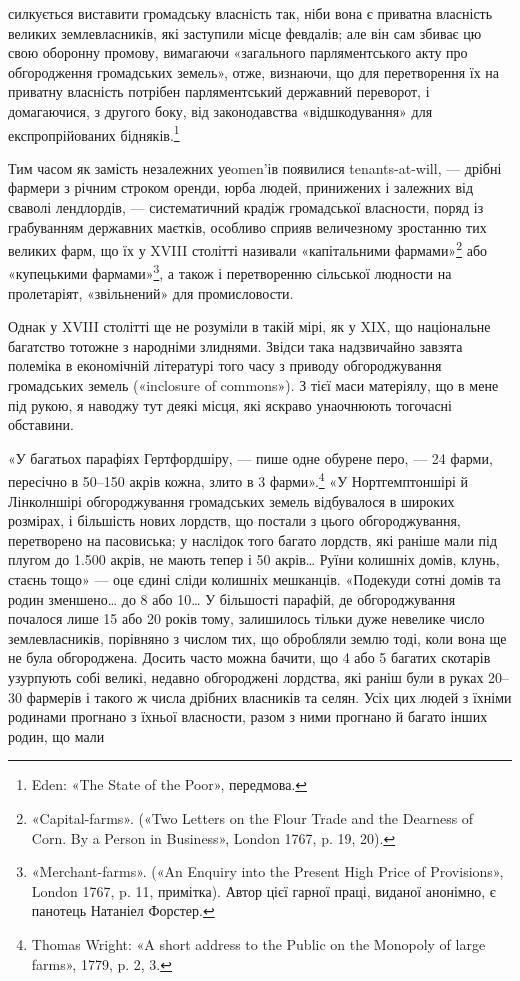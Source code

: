 \parcont{}  %
силкується виставити громадську власність так, ніби вона є
приватна власність великих землевласників, які заступили місце
февдалів; але він сам збиває цю свою оборонну промову, вимагаючи
«загального парляментського акту про обгородження громадських
земель», отже, визнаючи, що для перетворення їх на
приватну власність потрібен парляментський державний переворот,
і домагаючися, з другого боку, від законодавства «відшкодування»
для експропрійованих бідняків.\footnote{
Eden: «The State of the Poor», передмова.
}

Тим часом як замість незалежних уеomen’ів появилися tenants-at-will,
— дрібні фармери з річним строком оренди, юрба
людей, принижених і залежних від сваволі лендлордів, — систематичний
крадіж громадської власности, поряд із грабуванням
державних маєтків, особливо сприяв величезному зростанню
тих великих фарм, що їх у XVIII столітті називали «капітальними
фармами»\footnote{
«Capital-farms». («Two Letters on the Flour Trade and the Dearness
of Corn. By a Person in Business», London 1767, p. 19, 20).
} або «купецькими фармами»\footnote{
«Merchant-farms». («An Enquiry into the Present High Price
of Provisions», London 1767, p. 11, примітка). Автор цієї гарної праці,
виданої анонімно, є панотець Натаніел Форстер.
}, а також і перетворенню
сільської людности на пролетаріят, «звільнений» для
промисловости.

Однак у XVIII столітті ще не розуміли в такій мірі, як у
XIX, що національне багатство тотожне з народніми злиднями.
Звідси така надзвичайно завзята полеміка в економічній літературі
того часу з приводу обгороджування громадських земель
(«inclosure of commons»). З тієї маси матеріялу, що в мене під
рукою, я наводжу тут деякі місця, які яскраво унаочнюють тогочасні
обставини.

«У багатьох парафіях Гертфордшіру, — пише одне обурене
перо, — 24 фарми, пересічно в 50--150 акрів кожна, злито в
3 фарми».\footnote{
Thomas Wright: «A short address to the Public on the Monopoly
of large farms», 1779, p. 2, 3.
} «У Нортгемптоншірі й Лінколншірі обгороджування
громадських земель відбувалося в широких розмірах, і
більшість нових лордств, що постали з цього обгороджування,
перетворено на пасовиська; у наслідок того багато лордств, які
раніше мали під плугом до 1.500 акрів, не мають тепер і 50 акрів\dots{}
Руїни колишніх домів, клунь, стаєнь тощо» — оце єдині
сліди колишніх мешканців. «Подекуди сотні домів та родин
зменшено\dots{} до 8 або 10\dots{} У більшості парафій, де обгороджування
почалося лише 15 або 20 років тому, залишилось тільки дуже
невелике число землевласників, порівняно з числом тих, що
обробляли землю тоді, коли вона ще не була обгороджена. Досить
часто можна бачити, що 4 або 5 багатих скотарів узурпують
собі великі, недавно обгороджені лордства, які раніш були в
руках 20--30 фармерів і такого ж числа дрібних власників та
селян. Усіх цих людей з їхніми родинами прогнано з їхньої
власности, разом з ними прогнано й багато інших родин, що мали
\parbreak{}  %

